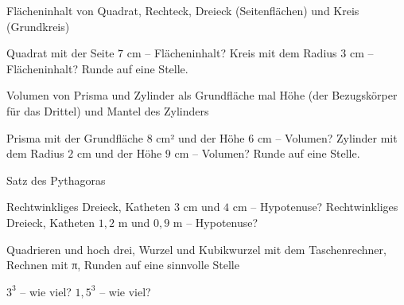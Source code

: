 \setcounter{aufgabe}{0}

\begin{aufgabe}{Flächeninhalt von Quadrat, Rechteck, Dreieck (Seitenflächen) und Kreis (Grundkreis)}
\begin{teile}
\teil Quadrat mit der Seite $7$ cm – Flächeninhalt? \leerfeld[cm²]
\teil Kreis mit dem Radius $3$ cm – Flächeninhalt? Runde auf eine Stelle. \leerfeld[cm²]
\end{teile}
\end{aufgabe}

\begin{aufgabe}{Volumen von Prisma und Zylinder als Grundfläche mal Höhe (der Bezugskörper für das Drittel) und Mantel des Zylinders}
\begin{teile}
\teil Prisma mit der Grundfläche $8$ cm² und der Höhe $6$ cm – Volumen? \leerfeld[cm³]
\teil Zylinder mit dem Radius $2$ cm und der Höhe $9$ cm – Volumen? Runde auf eine Stelle. \leerfeld[cm³]
\end{teile}
\end{aufgabe}

\begin{aufgabe}{Satz des Pythagoras}
\begin{teile}
\teil Rechtwinkliges Dreieck, Katheten $3$ cm und $4$ cm – Hypotenuse? \leerfeld[cm]
\teil Rechtwinkliges Dreieck, Katheten $1{,}2$ m und $0{,}9$ m – Hypotenuse? \leerfeld[m]
\end{teile}
\end{aufgabe}

\begin{aufgabe}{Quadrieren und hoch drei, Wurzel und Kubikwurzel mit dem Taschenrechner, Rechnen mit π, Runden auf eine sinnvolle Stelle}
\begin{teile}
\teil $3^3$ – wie viel? \leerfeld
\teil $1{,}5^3$ – wie viel? \leerfeld
\end{teile}
\end{aufgabe}

